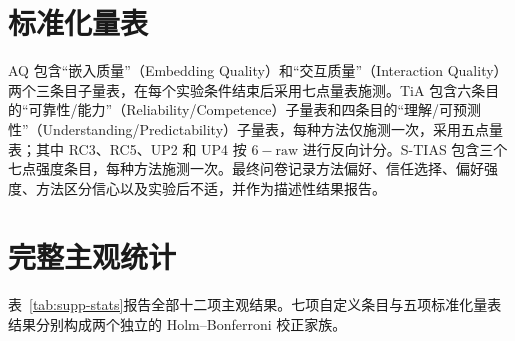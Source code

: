\documentclass[review]{vgtc}
\begin{document}
\section{标准化量表}\label{sec:supp-scales}

AQ 包含“嵌入质量”（Embedding Quality）和“交互质量”（Interaction Quality）两个三条目子量表，在每个实验条件结束后采用七点量表施测。TiA 包含六条目的“可靠性/能力”（Reliability/Competence）子量表和四条目的“理解/可预测性”（Understanding/Predictability）子量表，每种方法仅施测一次，采用五点量表；其中 RC3、RC5、UP2 和 UP4 按 $6-\text{raw}$ 进行反向计分。S-TIAS 包含三个七点强度条目，每种方法施测一次。最终问卷记录方法偏好、信任选择、偏好强度、方法区分信心以及实验后不适，并作为描述性结果报告。

\section{完整主观统计}\label{sec:supp-stats}

表~\ref{tab:supp-stats}报告全部十二项主观结果。七项自定义条目与五项标准化量表结果分别构成两个独立的 Holm--Bonferroni 校正家族。
\end{document}
